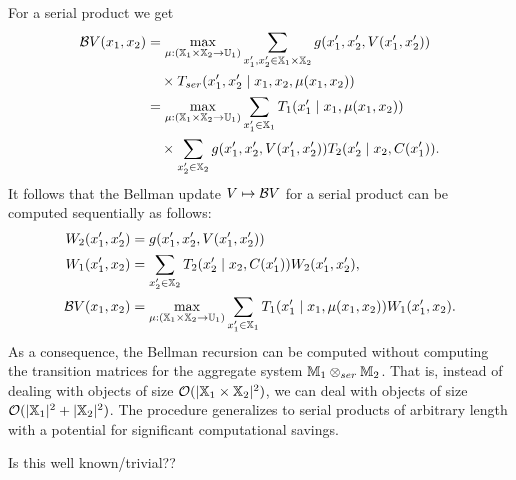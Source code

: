 \documentclass[conference]{IEEEtran}
\newcommand{\red}[1]{{\color{red} #1 }}
\begin{document}
For a serial product we get
\begin{equation*}
\begin{aligned}
  \mathcal{B} V (x_1, x_2) & = \max_{\mu: (\mathbb{X}_1 \times \mathbb{X}_2 \rightarrow \mathbb{U}_1)} \sum_{x_1', x_2' \in \mathbb{X}_1 \times \mathbb{X}_2}  g(x_1', x_2', V(x_1', x_2')) \\
  & \quad \times T_{ser}(x_1', x_2' \mid x_1, x_2, \mu(x_1, x_2)) \\
  & = \max_{\mu: (\mathbb{X}_1 \times \mathbb{X}_2 \rightarrow \mathbb{U}_1)} \sum_{x_1' \in \mathbb{X}_1} T_1(x_1' \mid x_1, \mu(x_1, x_2)) \\
  & \quad \times \sum_{x_2' \in \mathbb{X}_2}  g(x_1', x_2', V(x_1', x_2')) T_2(x_2' \mid x_2, C(x_1')).
\end{aligned}
\end{equation*}
It follows that the Bellman update $V \mapsto \mathcal{B} V$ for a serial product can be computed sequentially as follows:
\begin{equation*}
\begin{aligned}
  W_2(x_1', x_2') & = g(x_1', x_2', V(x_1', x_2')) \\
  W_1(x_1', x_2) & = \sum_{x_2' \in \mathbb{X}_2}  T_2(x_2' \mid x_2, C(x_1')) W_2(x_1', x_2'), \\
  \mathcal{B} V(x_1, x_2) & = \max_{\mu: (\mathbb{X}_1 \times \mathbb{X}_2 \rightarrow \mathbb{U}_1)} \sum_{x_1' \in \mathbb{X}_1} T_1(x_1' \mid x_1, \mu(x_1, x_2)) W_1(x_1', x_2).
\end{aligned}
\end{equation*}
As a consequence, the Bellman recursion can be computed without computing the transition matrices for the aggregate system $\mathbb{M}_1 \otimes_{ser} \mathbb{M}_2$. That is, instead of dealing with objects of size $\mathcal O(| \mathbb{X}_1 \times \mathbb{X}_2 |^2)$, we can deal with objects of size $\mathcal O(|\mathbb{X}_1|^2 + |\mathbb{X}_2|^2)$. The procedure generalizes to serial products of arbitrary length with a potential for significant computational savings. 

\red{Is this well known/trivial??}
\end{document}
